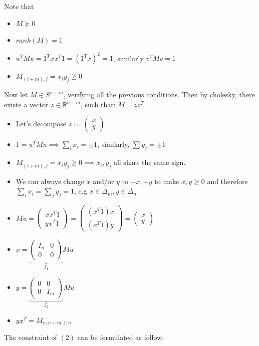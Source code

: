 \documentclass[11pt]{article}
\begin{document}
Note that
\begin{itemize}
\item \(M \succeq 0\)
\item \(rank(M) = 1\)
\item \(u^TMu = 1^Txx^T1 = (1^Tx)^2 = 1\), similarly \(v^TMv = 1\)
\item \(M_{(i+m), j} = x_iy_j \ge 0\)
\end{itemize}

Now let \(M \in S^{n+m}\), verifying all the previous conditions. Then by cholesky, there existe a vector \(z \in \mathbb R^{n+m}\), such that: \(M = zz^T\)

\begin{itemize}
\item Let's decompose \(z := \begin{pmatrix}x \\ y\end{pmatrix}\)
\item \(1 = u^TMu \implies \sum_i x_i = \pm 1\), similarly, \(\sum y_j = \pm 1\)
\item \(M_{(i+m), j} = x_iy_j \ge 0 \implies x_i, y_j\) all share the same sign.
\item We can always change \(x\) and/or \(y\) to \(-x, -y\) to make \(x, y \ge 0\) and therefore \(\sum_i x_i = \sum_j y_j = 1\), e.g \(x \in \Delta_m, y \in \Delta_n\)
\item \(Mu = \begin{pmatrix}xx^T 1\\yx^T1\end{pmatrix} = \begin{pmatrix}(x^T 1) x\\(x^T1)y\end{pmatrix} = \begin{pmatrix}x\\y\end{pmatrix}\)
\item \(x = \underbrace{\begin{pmatrix}I_n&0\\0&0\end{pmatrix}}_{J_1}Mu\)
\item \(y = \underbrace{\begin{pmatrix}0&0\\0&I_m\end{pmatrix}}_{J_2}Mu\)
\item \(yx^T = M_{n:n+m, 1:n}\)
\end{itemize}

The constraint of \((2)\) can be formulated as follow:
\end{document}
